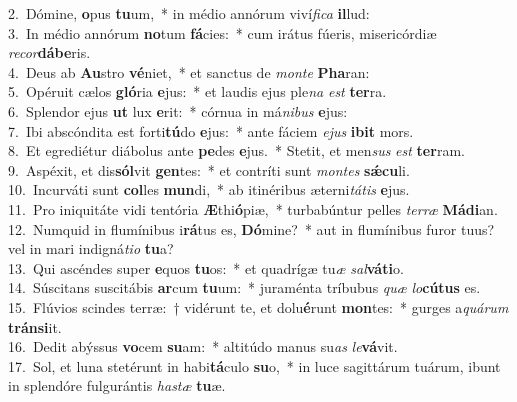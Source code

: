 {2.~}Dómine, \textbf{o}pus \textbf{tu}um,~* in médio annórum viví\textit{fi}\textit{ca} \textbf{il}lud:\\
{3.~}In médio annórum \textbf{no}tum \textbf{fá}cies:~* cum irátus fúeris, misericórdiæ \textit{re}\textit{cor}\textbf{dá}\textbf{be}ris.\\
{4.~}Deus ab \textbf{Au}stro \textbf{vé}niet,~* et sanctus de \textit{mon}\textit{te} \textbf{Pha}ran:\\
{5.~}Opéruit cælos \textbf{gló}ria \textbf{e}jus:~* et laudis ejus ple\textit{na} \textit{est} \textbf{ter}ra.\\
{6.~}Splendor ejus \textbf{ut} lux \textbf{e}rit:~* córnua in má\textit{ni}\textit{bus} \textbf{e}jus:\\
{7.~}Ibi abscóndita est forti\textbf{tú}do \textbf{e}jus:~* ante fáciem \textit{e}\textit{jus} \textbf{i}\textbf{bit} mors.\\
{8.~}Et egrediétur diábolus ante \textbf{pe}des \textbf{e}jus.~* Stetit, et men\textit{sus} \textit{est} \textbf{ter}ram.\\
{9.~}Aspéxit, et dis\textbf{sól}vit \textbf{gen}tes:~* et contríti sunt \textit{mon}\textit{tes} \textbf{sǽ}\textbf{cu}li.\\
{10.~}Incurváti sunt \textbf{col}les \textbf{mun}di,~* ab itinéribus æterni\textit{tá}\textit{tis} \textbf{e}jus.\\
{11.~}Pro iniquitáte vidi tentória \textbf{Æ}thi\textbf{ó}piæ,~* turbabúntur pelles \textit{ter}\textit{ræ} \textbf{Má}\textbf{di}an.\\
{12.~}Numquid in flumínibus i\textbf{rá}tus es, \textbf{Dó}mine?~* aut in flumínibus furor tuus? vel in mari indigná\textit{ti}\textit{o} \textbf{tu}a?\\
{13.~}Qui ascéndes super \textbf{e}quos \textbf{tu}os:~* et quadrígæ tu\textit{æ} \textit{sal}\textbf{vá}\textbf{ti}o.\\
{14.~}Súscitans suscitábis \textbf{ar}cum \textbf{tu}um:~* juraménta tríbubus \textit{quæ} \textit{lo}\textbf{cú}\textbf{tus} es.\\
{15.~}Flúvios scindes terræ:~† vidérunt te, et dolu\textbf{é}runt \textbf{mon}tes:~* gurges a\textit{quá}\textit{rum} \textbf{trán}\textbf{si}it.\\
{16.~}Dedit abýssus \textbf{vo}cem \textbf{su}am:~* altitúdo manus su\textit{as} \textit{le}\textbf{vá}vit.\\
{17.~}Sol, et luna stetérunt in habi\textbf{tá}culo \textbf{su}o,~* in luce sagittárum tuárum, ibunt in splendóre fulgurántis \textit{ha}\textit{stæ} \textbf{tu}æ.\\

